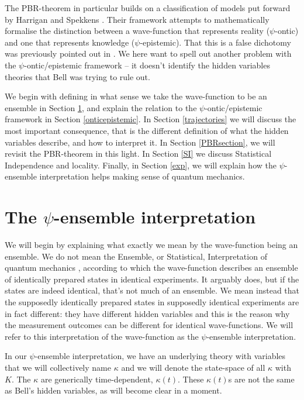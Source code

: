 \documentclass[superscriptaddress,floatfix,nofootinbib,12pt]{revtex4-2}
\begin{document}
The {\sc PBR}-theorem in particular builds on a classification of models put forward by Harrigan and Spekkens \cite{Harrigan2010OMF}. Their framework attempts to mathematically formalise the distinction between a wave-function that represents reality ($\psi$-ontic) and one that represents knowledge ($\psi$-epistemic). That this is a false dichotomy was previously pointed out in \cite{Hance2021Wavefunctions}. We here want to spell out another problem with the $\psi$-ontic/epistemic framework -- it doesn't identify the hidden variables theories that Bell was trying to rule out. 

We begin with defining in what sense we take the wave-function to be an ensemble in Section \ref{ensemble}, and explain the relation to the $\psi$-ontic/epistemic framework in Section \ref{onticepistemic}. In Section \ref{trajectories} we will discuss the most important consequence, that is the different definition of what the hidden variables describe, and how to interpret it. In Section \ref{PBRsection}, we will revisit the {\sc PBR}-theorem in this light. In Section \ref{SI} we discuss Statistical Independence and locality. Finally, in Section \ref{exp}, we will explain how the $\psi$-ensemble interpretation helps making sense of quantum mechanics.

\section{The \texorpdfstring{$\psi$}{psi}-ensemble interpretation}
\label{ensemble}

We will begin by explaining what exactly we mean by the wave-function being an ensemble. We do not mean the Ensemble, or Statistical, Interpretation of quantum mechanics \cite{Ballentine1970Statistical}, according to which the wave-function describes an ensemble of identically prepared states in identical experiments. It arguably does, but if the states are indeed identical, that's not much of an ensemble. We mean instead that the supposedly identically prepared states in supposedly identical experiments are in fact different: they have different hidden variables and this is the reason why the measurement outcomes can be different for identical wave-functions. We will refer to this interpretation of the wave-function as the $\psi$-ensemble interpretation.

In our $\psi$-ensemble interpretation, we have an underlying theory with variables that we will collectively name $\kappa$ and we will denote the state-space of all $\kappa$ with $K$. 
The $\kappa$ are generically time-dependent, $\kappa(t)$. 
These $\kappa(t)$s are not the same as Bell's hidden variables, as will become clear in a moment.
\end{document}
